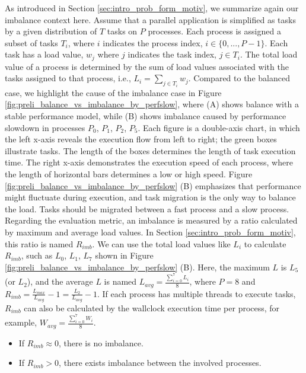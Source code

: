 As introduced in Section \ref{sec:intro_prob_form_motiv}, we summarize again our imbalance context here. Assume that a parallel application is simplified as tasks by a given distribution of $T$ tasks on $P$ processes. Each process is assigned a subset of tasks $T_{i}$, where $i$ indicates the process index, $i \in \{0, ..., P-1\}$. Each task has a load value, $w_{j}$ where $j$ indicates the task index, $j \in T_{i}$. The total load value of a process is determined by the sum of load values associated with the tasks assigned to that process, i.e., $L_{i} = \sum_{j \in T_{i}} w_{j}$. Compared to the balanced case, we highlight the cause of the imbalance case in Figure \ref{fig:preli_balance_vs_imbalance_by_perfslow}, where (A) shows balance with a stable performance model, while (B) shows imbalance caused by performance slowdown in processes $P_{0}$, $P_{1}$, $P_{2}$, $P_{5}$. Each figure is a double-axis chart, in which the left x-axis reveals the execution flow from left to right; the green boxes illustrate tasks. The length of the boxes determines the length of task execution time. The right x-axis demonstrates the execution speed of each process, where the length of horizontal bars determines a low or high speed. Figure \ref{fig:preli_balance_vs_imbalance_by_perfslow} (B) emphasizes that performance might fluctuate during execution, and task migration is the only way to balance the load. Tasks should be migrated between a fast process and a slow process.\\

Regarding the evaluation metric, an imbalance is measured by a ratio calculated by maximum and average load values. In Section \ref{sec:intro_prob_form_motiv}, this ratio is named $R_{imb}$. We can use the total load values like $L_{i}$ to calculate $R_{imb}$, such as $L_{0}$, $L_{1}$, $L_{7}$ shown in Figure \ref{fig:preli_balance_vs_imbalance_by_perfslow} (B). Here, the maximum $L$ is $L_{5}$ (or $L_{2}$), and the average $L$ is named $L_{avg} = \frac{\sum_{i=0}^7 L_{i}}{8}$, where $P=8$ and $R_{imb} = \frac{L_{max}}{L_{avg}} - 1 = \frac{L_{2}}{L_{avg}} - 1$. If each process has multiple threads to execute tasks, $R_{imb}$ can also be calculated by the wallclock execution time per process, for example, $W_{avg} = \frac{\sum_{i=0}^7 W_{i}}{8}$.
\begin{itemize}
	\item If $R_{imb} \approx 0$, there is no imbalance.
	\item If $R_{imb} > 0$, there exists imbalance between the involved processes.
\end{itemize}

